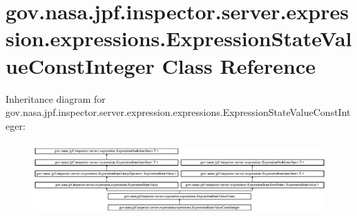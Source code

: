 \hypertarget{classgov_1_1nasa_1_1jpf_1_1inspector_1_1server_1_1expression_1_1expressions_1_1_expression_state_value_const_integer}{}\section{gov.\+nasa.\+jpf.\+inspector.\+server.\+expression.\+expressions.\+Expression\+State\+Value\+Const\+Integer Class Reference}
\label{classgov_1_1nasa_1_1jpf_1_1inspector_1_1server_1_1expression_1_1expressions_1_1_expression_state_value_const_integer}
Inheritance diagram for gov.\+nasa.\+jpf.\+inspector.\+server.\+expression.\+expressions.\+Expression\+State\+Value\+Const\+Integer\+:\begin{figure}[H]
\begin{center}
\leavevmode
\includegraphics[height=2.847458cm]{classgov_1_1nasa_1_1jpf_1_1inspector_1_1server_1_1expression_1_1expressions_1_1_expression_state_value_const_integer}
\end{center}
\end{figure}

